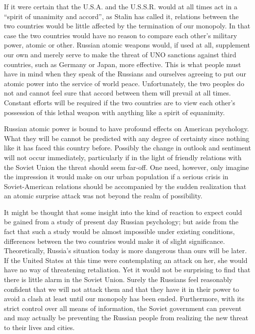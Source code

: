 If it were certain that the U.S.A. and the U.S.S.R. would at all times act in a ``spirit of unanimity and accord'', as Stalin has called it, relations between the two countries would be little affected by the termination of our monopoly. In that case the two countries would have no reason to compare each other's military power, atomic or other. Russian atomic weapons would, if used at all, supplement our own and merely serve to make the threat of UNO sanctions against third countries, such as Germany or Japan, more effective. This is what people must have in mind when they speak of the Russians and ourselves agreeing to put our atomic power into the service of world peace. Unfortunately, the two peoples do not and cannot feel sure that accord between them will prevail at all times. Constant efforts will be required if the two countries are to view each other's possession of this lethal weapon with anything like a spirit of equanimity.

Russian atomic power is bound to have profound effects on American psychology. What they will be cannot be predicted with any degree of certainty since nothing like it has faced this country before. Possibly the change in outlook and sentiment will not occur immediately, particularly if in the light of friendly relations with the Soviet Union the threat should seem far-off. One need, however, only imagine the impression it would make on our urban population if a serious crisis in Soviet-American relations should be accompanied by the sudden realization that an atomic surprise attack was not beyond the realm of possibility.

It might be thought that some insight into the kind of reaction to expect could be gained from a study of present day Russian psychology; but aside from the fact that such a study would be almost impossible under existing conditions, differences between the two countries would make it of slight significance. Theoretically, Russia's situation today is more dangerous than ours will be later. If the United States at this time were contemplating an attack on her, she would have no way of threatening retaliation. Yet it would not be surprising to find that there is little alarm in the Soviet Union. Surely the Russians feel reasonably confident that we will not attack them and that they have it in their power to avoid a clash at least until our monopoly has been ended. Furthermore, with its strict control over all means of information, the Soviet government can prevent and may actually be preventing the Russian people from realizing the new threat to their lives and cities.

